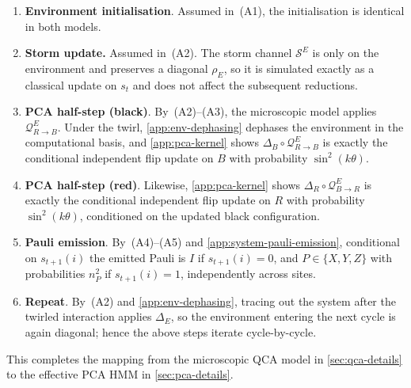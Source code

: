 \begin{enumerate}
    \item[0.] \textbf{Environment initialisation}. Assumed in~(A1), the initialisation is identical in both models.

    \item \textbf{Storm update.}
    Assumed in~(A2). The storm channel \(\mathcal{S}^E\) is only on the environment and preserves a diagonal \(\rho_E\), so it is simulated exactly as a classical update on \(s_t\) and does not affect the subsequent reductions.

    \item \textbf{PCA half-step (black)}.
    By~(A2)–(A3), the microscopic model applies \(\mathcal{Q}_{R\to B}^E\). Under the twirl, \cref{app:env-dephasing} dephases the environment in the computational basis, and \cref{app:pca-kernel} shows \(\Delta_B\circ \mathcal{Q}_{R\to B}^E\) is exactly the conditional independent flip update on \(B\) with probability \(\sin^2(k\theta)\).

    \item \textbf{PCA half-step (red)}.
    Likewise, \cref{app:pca-kernel} shows \(\Delta_R\circ \mathcal{Q}_{B\to R}^E\) is exactly the conditional independent flip update on \(R\) with probability \(\sin^2(k\theta)\), conditioned on the updated black configuration.
    
    \item \textbf{Pauli emission}.
    By~(A4)–(A5) and \cref{app:system-pauli-emission}, conditional on \(s_{t+1}(i)\) the emitted Pauli is \(I\) if \(s_{t+1}(i)=0\), and \(P\in\{X,Y,Z\}\) with probabilities \(n_P^2\) if \(s_{t+1}(i)=1\), independently across sites.
    
    \item \textbf{Repeat}. 
    By~(A2) and \cref{app:env-dephasing}, tracing out the system after the twirled interaction applies \(\Delta_E\), so the environment entering the next cycle is again diagonal; hence the above steps iterate cycle-by-cycle.
\end{enumerate}
This completes the mapping from the microscopic QCA model in \cref{sec:qca-details} to the effective PCA HMM in \cref{sec:pca-details}.